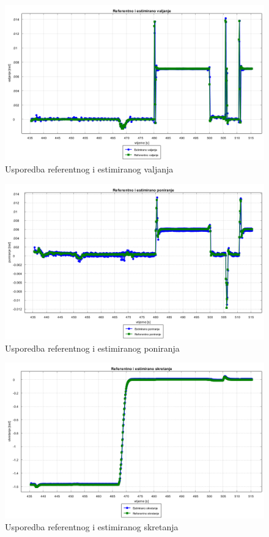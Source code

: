 \begin{figure}[H]
  \includegraphics[scale=0.4]{images/algo1/primjer4/referentno_estimirano_valjanje.png}
  \caption{Usporedba referentnog i estimiranog valjanja}
  \label{eval:a1p4_rot_roll}
\end{figure}
\begin{figure}[H]
  \includegraphics[scale=0.4]{images/algo1/primjer4/referentno_estimirano_poniranje.png}
  \caption{Usporedba referentnog i estimiranog poniranja}
  \label{eval:a1p4_rot_pitch}
\end{figure}
\begin{figure}[H]
  \includegraphics[scale=0.4]{images/algo1/primjer4/referentno_estimirano_skretanje.png}
  \caption{Usporedba referentnog i estimiranog skretanja}
  \label{eval:a1p4_rot_yaw}
\end{figure}
\pagebreak